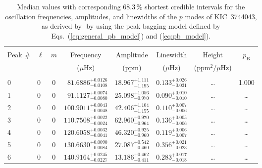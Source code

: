 \begin{table*}[!]
\caption{Median values with corresponding 68.3\,\% shortest credible intervals for the oscillation frequencies, amplitudes, and linewidths of the $p$ modes of KIC~3744043, as derived by \diamonds\,\,by using the peak bagging model defined by Eqs.~(\ref{eq:general_pb_model}) and (\ref{eq:pb_model}).}
\label{tab:3744043p}
\centering
\begin{tabular}{llcrrlrc}
\hline\hline
\\[-8pt]          
Peak \# & $\ell$ & $m$ & \multicolumn{1}{c}{Frequency} & \multicolumn{1}{c}{Amplitude} & \multicolumn{1}{c}{Linewidth} & \multicolumn{1}{c}{Height}& $p_\mathrm{B}$\\
 & & & \multicolumn{1}{c}{($\mu$Hz)} & \multicolumn{1}{c}{(ppm)} & \multicolumn{1}{c}{($\mu$Hz)} & \multicolumn{1}{c}{(ppm$^2/\mu$Hz)}\\
\hline \\[-8pt]
0 & 0 & 0 & $     81.6886_{-      0.0108}^{+      0.0126}$ & $      18.967_{-       1.195}^{+       1.111}$ & $       0.133_{-       0.031}^{+       0.026}$ & \multicolumn{1}{c}{\dots} & 1.000\\[1pt]
1 & 0 & 0 & $     91.1127_{-      0.0080}^{+      0.0074}$ & $      25.098_{-       0.970}^{+       1.056}$ & $       0.090_{-       0.010}^{+       0.010}$ & \multicolumn{1}{c}{\dots} & \dots \\[1pt]
2 & 0 & 0 & $    100.9011_{-      0.0048}^{+      0.0043}$ & $      42.406_{-       1.155}^{+       1.104}$ & $       0.110_{-       0.006}^{+       0.007}$ & \multicolumn{1}{c}{\dots} & \dots \\[1pt]
3 & 0 & 0 & $    110.7508_{-      0.0024}^{+      0.0022}$ & $      62.960_{-       0.964}^{+       0.970}$ & $       0.136_{-       0.006}^{+       0.005}$ & \multicolumn{1}{c}{\dots} & \dots\\[1pt]
4 & 0 & 0 & $    120.6058_{-      0.0041}^{+      0.0032}$ & $      46.320_{-       0.960}^{+       0.925}$ & $       0.119_{-       0.007}^{+       0.006}$ & \multicolumn{1}{c}{\dots} & \dots\\[1pt]
5 & 0 & 0 & $    130.6630_{-      0.0084}^{+      0.0090}$ & $      27.087_{-       0.460}^{+       0.542}$ & $       0.356_{-       0.023}^{+       0.021}$ & \multicolumn{1}{c}{\dots} & \dots \\[1pt]
6 & 0 & 0 & $    140.9164_{-      0.0227}^{+      0.0245}$ & $      13.186_{-       0.411}^{+       0.462}$ & $       0.283_{-       0.018}^{+       0.017}$ & \multicolumn{1}{c}{\dots} & \dots\\[1pt]

\end{tabular}
\end{table*}
